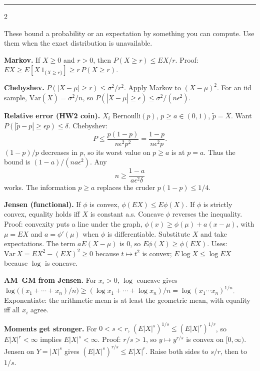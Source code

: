 \documentclass{article}
\newcommand{\sect}[1]{\par\vspace{1.05pt}{\fontsize{8}{9}\selectfont\textbf{#1}}\par\vspace{0.15pt}}
\newcommand{\kw}[1]{\textbf{#1}}
\begin{document}
\par
\vspace{1pt}\hrule\vspace{1.5pt}
\fontsize{8.9}{10.4}\selectfont
\begin{multicols}{2}

\sect{1. Inequalities (3.6, 4.7)}
These bound a probability or an expectation by something you can compute. Use them when the exact distribution is unavailable.

\kw{Markov.} If $X\ge 0$ and $r>0$, then $P(X\ge r)\le EX/r$. Proof: $EX\ge E[X\,1_{\{X\ge r\}}]\ge r\,P(X\ge r)$.

\kw{Chebyshev.} $P(|X-\mu|\ge r)\le \sigma^2/r^2$. Apply Markov to $(X-\mu)^2$. For an iid sample, $\mathrm{Var}(\bar X)=\sigma^2/n$, so $P(|\bar X-\mu|\ge\epsilon)\le\sigma^2/(n\epsilon^2)$.

\kw{Relative error (HW2 coin).} $X_i$ Bernoulli$(p)$, $p\ge a\in(0,1)$, $\tilde p=\bar X$. Want $P(|\tilde p-p|\ge\epsilon p)\le\delta$. Chebyshev:
\[
P\le\frac{p(1-p)}{n\epsilon^2 p^2}=\frac{1-p}{n\epsilon^2 p}.
\]
$(1-p)/p$ decreases in $p$, so its worst value on $p\ge a$ is at $p=a$. Thus the bound is $(1-a)/(n a\epsilon^2)$. Any
\[
n\ge\frac{1-a}{a\epsilon^2\delta}
\]
works. The information $p\ge a$ replaces the cruder $p(1-p)\le 1/4$.

\kw{Jensen (functional).} If $\phi$ is convex, $\phi(EX)\le E\phi(X)$. If $\phi$ is strictly convex, equality holds iff $X$ is constant a.s. Concave $\phi$ reverses the inequality. Proof: convexity puts a line under the graph, $\phi(x)\ge\phi(\mu)+a(x-\mu)$, with $\mu=EX$ and $a=\phi'(\mu)$ when $\phi$ is differentiable. Substitute $X$ and take expectations. The term $aE(X-\mu)$ is $0$, so $E\phi(X)\ge\phi(EX)$. Uses: $\mathrm{Var}\,X=EX^2-(EX)^2\ge 0$ because $t\mapsto t^2$ is convex; $E\log X\le\log EX$ because $\log$ is concave.

\kw{AM--GM from Jensen.} For $x_i>0$, $\log$ concave gives $\log\bigl((x_1+\cdots+x_n)/n\bigr)\ge(\log x_1+\cdots+\log x_n)/n=\log(x_1\cdots x_n)^{1/n}$. Exponentiate: the arithmetic mean is at least the geometric mean, with equality iff all $x_i$ agree.

\kw{Moments get stronger.} For $0<s<r$, $(E|X|^s)^{1/s}\le(E|X|^r)^{1/r}$, so $E|X|^r<\infty$ implies $E|X|^s<\infty$. Proof: $r/s>1$, so $y\mapsto y^{r/s}$ is convex on $[0,\infty)$. Jensen on $Y=|X|^s$ gives $(E|X|^s)^{r/s}\le E|X|^r$. Raise both sides to $s/r$, then to $1/s$.


\end{multicols}
\end{document}

